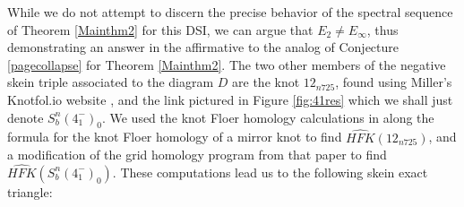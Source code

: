 \documentclass[11pt]{amsart}
\theoremstyle{definition}
\theoremstyle{remark}
\def\F{\mathbb{F}}
\def\HFK {\mathit{HFK}}
\newcommand\HFKhat{\widehat{\HFK}}
\numberwithin{equation}{section}
\begin{document}
While we do not attempt to discern the precise behavior of the spectral sequence of Theorem \ref{Mainthm2} for this DSI, we can argue that $E_2\neq E_\infty$, thus demonstrating an answer in the affirmative to the analog of Conjecture \ref{pagecollapse} for Theorem \ref{Mainthm2}. The two other members of the negative skein triple associated to the diagram $D$ are the knot $12_{n725}$, found using Miller's Knotfol.io website \cite{knotfol}, and the link pictured in Figure \ref{fig:41res} which we shall just denote $S^n_b(4_1^-)_0$. We used the knot Floer homology calculations in \cite{baldwin2007computationsheegaardfloerknothomology} along the formula for the knot Floer homology of a mirror knot to find $\HFKhat(12_{n725})$, and a modification of the grid homology program from that paper to find $\HFKhat(S^n_b(4_1^-)_0)$.  These computations lead us to the following skein exact triangle:
\vspace{1cm}
\begin{center}
\end{center}
\vspace{1cm}
\end{document}

